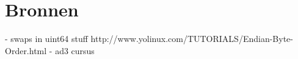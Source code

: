 \chapter*{Bronnen}
- swaps in uint64 stuff
http://www.yolinux.com/TUTORIALS/Endian-Byte-Order.html
- ad3 cursus